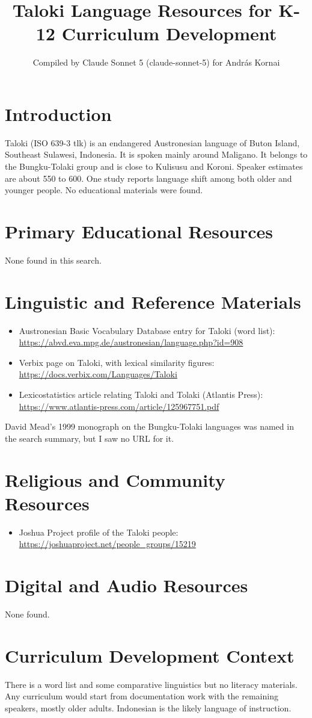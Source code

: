 \documentclass[12pt]{article}
\title{Taloki Language Resources for K-12 Curriculum Development}
\author{Compiled by Claude Sonnet 5 (claude-sonnet-5) for Andr\'as Kornai}
\date{}
\begin{document}
\maketitle

\section{Introduction}
Taloki (ISO 639-3 tlk) is an endangered Austronesian language of Buton Island, Southeast Sulawesi, Indonesia. It is spoken mainly around Maligano. It belongs to the Bungku-Tolaki group and is close to Kulisusu and Koroni. Speaker estimates are about 550 to 600. One study reports language shift among both older and younger people. No educational materials were found.

\section{Primary Educational Resources}
None found in this search.

\section{Linguistic and Reference Materials}
\begin{itemize}
\item Austronesian Basic Vocabulary Database entry for Taloki (word list): \url{https://abvd.eva.mpg.de/austronesian/language.php?id=908}
\item Verbix page on Taloki, with lexical similarity figures: \url{https://docs.verbix.com/Languages/Taloki}
\item Lexicostatistics article relating Taloki and Tolaki (Atlantis Press): \url{https://www.atlantis-press.com/article/125967751.pdf}
\end{itemize}
David Mead's 1999 monograph on the Bungku-Tolaki languages was named in the search summary, but I saw no URL for it.

\section{Religious and Community Resources}
\begin{itemize}
\item Joshua Project profile of the Taloki people: \url{https://joshuaproject.net/people_groups/15219}
\end{itemize}

\section{Digital and Audio Resources}
None found.

\section{Curriculum Development Context}
There is a word list and some comparative linguistics but no literacy materials. Any curriculum would start from documentation work with the remaining speakers, mostly older adults. Indonesian is the likely language of instruction.
\end{document}
